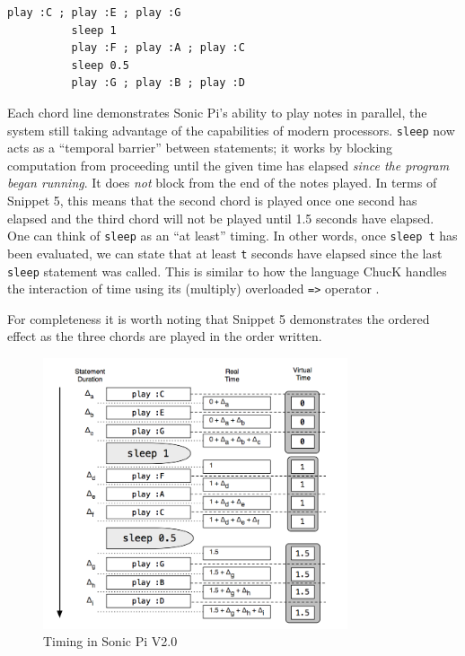 \documentclass[11pt, abstracton, twoside]{scrartcl}
\begin{document}
\begin{minipage}{\textwidth}
	\begin{lstlisting}[style = sonicpi]
		  play :C ; play :E ; play :G
		  sleep 1
		  play :F ; play :A ; play :C
		  sleep 0.5
		  play :G ; play :B ; play :D
	\end{lstlisting}
\end{minipage}

Each chord line demonstrates Sonic Pi's ability to play notes in parallel, the 
system still taking advantage of the capabilities of modern processors. \texttt
{sleep} now acts as a ``temporal barrier'' between statements; it works by 
blocking computation from proceeding until the given time has elapsed \emph{
since the program began running}. It does \emph{not} block from the end of the 
notes played. In terms of Snippet 5, this means that the second chord is 
played once one second has elapsed and the third chord will not be played 
until 1.5 seconds have elapsed. One can think of \texttt{sleep} as an ``at 
least'' timing. In other words, once \texttt{sleep t} has been evaluated, we 
can state that at least \texttt{t} seconds have elapsed since the last \texttt{
sleep} statement was called. This is similar to how the language ChucK handles 
the interaction of time using its (multiply) overloaded \texttt{=>} operator 
\cite{WC03}.

For completeness it is worth noting that Snippet 5 demonstrates the ordered 
effect as the three chords are played in the order written.

\begin{figure}[ht]
	\centering
	\includegraphics[width=0.8\textwidth]{images/sonic-two.png}
	\caption{Timing in Sonic Pi V2.0 \cite{AOB14}}
\end{figure}
\end{document}

